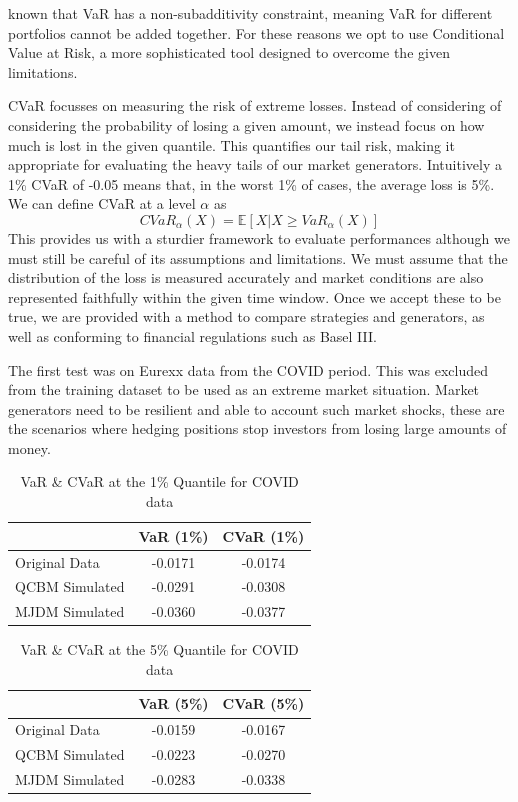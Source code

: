 \documentclass[12pt]{article}
\newcommand{\newp}
    {
    \vskip 0.5cm 
  }
\numberwithin{equation}{section}
\begin{document}
known that VaR has a non-subadditivity constraint, meaning VaR for different portfolios 
cannot be added together. For these reasons we opt to use Conditional Value at 
Risk, a more sophisticated tool designed to overcome the given limitations. 
\newp 
CVaR focusses on measuring the risk of extreme losses. Instead of considering of 
considering the probability of losing a given amount, we instead focus on how 
much is lost in the given quantile. This quantifies our tail risk, making it 
appropriate for evaluating the heavy tails of our market generators. Intuitively 
a 1\% CVaR of -0.05 means that, in the worst 1\% of cases, the average loss is 5\%. 
We can define CVaR at a level $\alpha$ as 
\begin{equation}
  CVaR_{\alpha}(X) = \mathbb{E}[X | X \geq VaR_{\alpha}(X)]
\end{equation}
This provides us with a sturdier framework to evaluate performances although we 
must still be careful of its assumptions and limitations. We must assume that the 
distribution of the loss is measured accurately and market conditions are also 
represented faithfully within the given time window. Once we accept these to be 
true, we are provided with a method to compare strategies and generators, as well 
as conforming to financial regulations such as Basel III.
\newp 
The first test was on Eurexx data from the COVID period. This was excluded from the training 
dataset to be used as an extreme market situation. Market generators need to be 
resilient and able to account such market shocks, these are the scenarios where 
hedging positions stop investors from losing large amounts of money.
\begin{table}[h!]
\centering
\begin{tabular}{lcc}
\hline
\textbf{} & \textbf{VaR (1\%)} & \textbf{CVaR (1\%)} \\
\hline
Original Data     & -0.0171 & -0.0174 \\
QCBM Simulated    & -0.0291 & -0.0308 \\
MJDM Simulated    & -0.0360 & -0.0377 \\
\hline
\end{tabular}
\caption{VaR \& CVaR at the 1\% Quantile for COVID data}
\label{tab:cvar_1}
\end{table}
\begin{table}[h!]
\centering
\begin{tabular}{lcc}
\hline
\textbf{} & \textbf{VaR (5\%)} & \textbf{CVaR (5\%)} \\
\hline
Original Data     & -0.0159 & -0.0167 \\
QCBM Simulated    & -0.0223 & -0.0270 \\
MJDM Simulated    & -0.0283 & -0.0338 \\
\hline
\end{tabular}
\caption{VaR \& CVaR at the 5\% Quantile for COVID data}
\label{tab:cvar_5}
\end{table}
\end{document}
